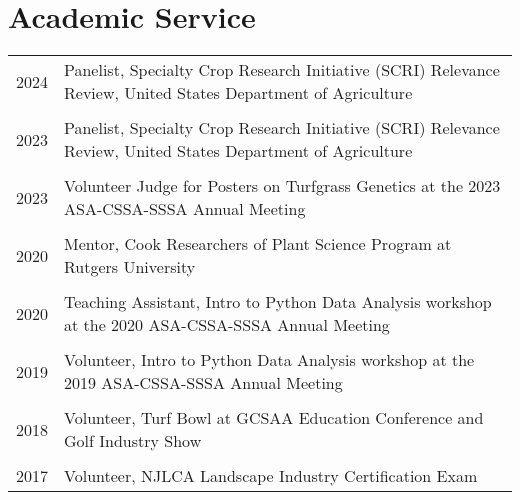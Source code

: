 \documentclass[letterpaper,11pt, english]{article}
\begin{document}
\section{Academic Service}
\begin{flushleft}
  \begin{tabularx}{\textwidth}{@{}lX@{}}
      2024 \hspace{1cm} & Panelist, Specialty Crop Research Initiative (SCRI) Relevance Review, United States Department of Agriculture  \\
      \\[-0.2cm] 
      2023 \hspace{1cm} & Panelist, Specialty Crop Research Initiative (SCRI) Relevance Review, United States Department of Agriculture  \\
      \\[-0.2cm] 
      2023 \hspace{1cm} & Volunteer Judge for Posters on Turfgrass Genetics at the 2023 ASA-CSSA-SSSA Annual Meeting \\
      \\[-0.2cm] 
      2020 \hspace{1cm} & Mentor, Cook Researchers of Plant Science Program at Rutgers University \\
      \\[-0.2cm] 
      2020 \hspace{1cm} & Teaching Assistant, Intro to Python Data Analysis workshop at the 2020 ASA-CSSA-SSSA Annual Meeting \\
      \\[-0.2cm] 
      2019 \hspace{1cm} & Volunteer, Intro to Python Data Analysis workshop at the 2019 ASA-CSSA-SSSA Annual Meeting \\
      \\[-0.2cm] 
      2018 \hspace{1cm} & Volunteer, Turf Bowl at GCSAA Education Conference and Golf Industry Show \\
      \\[-0.2cm] 
      2017 \hspace{1cm} & Volunteer, NJLCA Landscape Industry Certification Exam \\
  \end{tabularx}
\end{flushleft}
\end{document}
